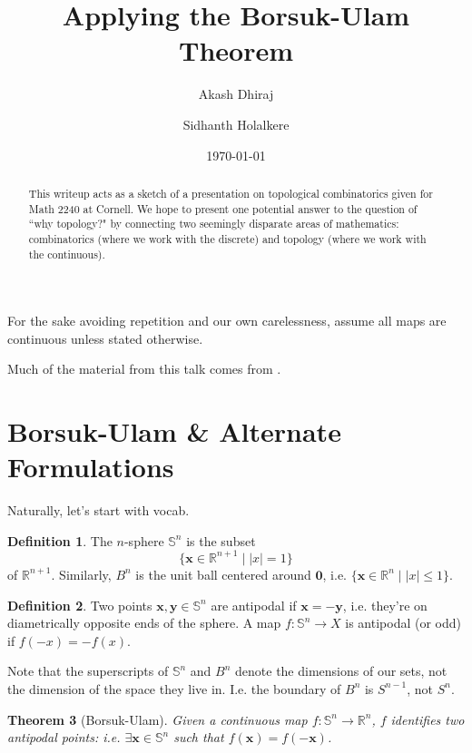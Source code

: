 \documentclass[12pt]{amsart}
\newtheorem{thm}{Theorem}[section]
\theoremstyle{definition}
\newtheorem{dfn}[thm]{Definition}
\begin{document}
    \title{Applying the Borsuk-Ulam Theorem}
    \author{Akash Dhiraj}
    \author{Sidhanth Holalkere}
    \email{}
    \date{\today}

    \begin{abstract}
        This writeup acts as a sketch of a presentation on topological combinatorics given for Math 2240 at Cornell. We hope to present one potential answer to the question of ``why topology?" by connecting two seemingly disparate areas of mathematics: combinatorics (where we work with the discrete) and topology (where we work with the continuous).
    \end{abstract}

    \maketitle

    For the sake avoiding repetition and our own carelessness, assume all maps are continuous unless stated otherwise. 
    
    Much of the material from this talk comes from \cite{topcombi}.

    \section{Borsuk-Ulam \& Alternate Formulations}

    Naturally, let's start with vocab.

    \begin{dfn}
    The $n$-sphere $\mathbb S^n$ is the subset $$\{\mathbf x \in \mathbb R^{n+1} \mid |x| = 1\}$$ of $\mathbb R^{n+1}$. Similarly, $B^n$ is the unit ball centered around $\mathbf 0$, i.e. $\{\mathbf x \in \mathbb R^n \mid |x| \leq 1\}$.
    \end{dfn}

    \begin{dfn}
        Two points $\mathbf x, \mathbf y \in \mathbb S^n$ are antipodal if $\mathbf x = -\mathbf y$, i.e. they're on diametrically opposite ends of the sphere. A map $f: \mathbb S^n \to X$ is antipodal (or odd) if $f(-x) = -f(x)$.
    \end{dfn}

    Note that the superscripts of $\mathbb S^n$ and $B^n$ denote the dimensions of our sets, not the dimension of the space they live in. I.e. the boundary of $B^n$ is $S^{n-1}$, not $S^n$.

    \begin{thm}[Borsuk-Ulam]
        \label{main}
        Given a continuous map $f: \mathbb S^n \to \mathbb R^n$, $f$ identifies two antipodal points: i.e. $\exists \mathbf x \in \mathbb S^n$ such that $f(\mathbf x) = f(-\mathbf x)$.
    \end{thm}
\end{document}
